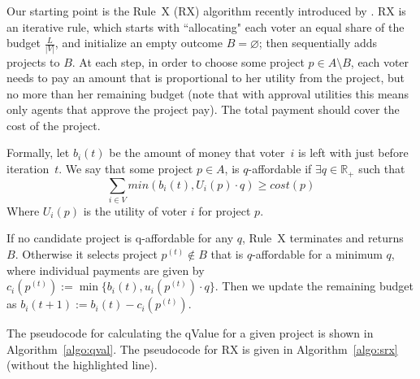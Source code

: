 \documentclass[runningheads]{llncs}
\begin{document}
Our starting point is the Rule~X (RX) algorithm recently introduced by \citet{peters2020proportional}. 
RX is an iterative rule, which starts with ``allocating" each voter an equal share of the budget $\frac{L}{|V|}$, and  initialize an empty outcome $B=\varnothing$; then sequentially adds projects to $B$. At each step, in order to choose some project $p\in A\setminus B$, each voter needs to pay an amount that is proportional to her utility from the project, but no more than her remaining budget (note that with approval utilities this means only agents that approve the project pay). The  total payment should cover the cost of the project. 
 
 Formally, let $b_i(t)$ be the amount of money that voter~$i$ is left with just before iteration~$t$.
 We say that some project $p\in A$, is $q$-affordable if $\exists q\in \mathbb{R}_+$ such that 
$$\sum_{i\in V}min(b_i(t),U_i(p)\cdot q)\geq cost(p)$$
Where $U_i(p)$ is the utility of voter $i$ for project $p$.

If no candidate project is q-affordable for any $q$, Rule~X terminates and returns $B$. Otherwise it selects project $p^{(t)}\notin B$ that is $q$-affordable for a minimum $q$, where individual payments are given by $c_i(p^{(t)}):=\min\{b_i(t),u_i(p^{(t)})\cdot q\}$. Then we update the remaining budget as $b_i(t+1):=b_i(t)-c_i(p^{(t)})$.

 The pseudocode for calculating the  qValue for a given project is shown in Algorithm~\ref{algo:qval}.  
The pseudocode for RX is given in Algorithm~\ref{algo:srx} (without the highlighted line).
\end{document}
